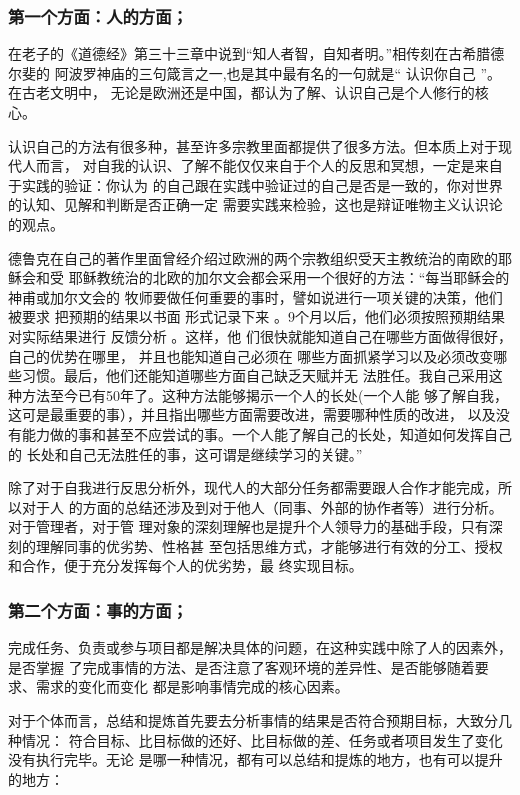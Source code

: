 \documentclass[11pt]{ctexart}
\begin{document}
{{{{\subsubsection{第一个方面：人的方面；}
\label{sec:orgd4028ee}

在老子的《道德经》第三十三章中说到“知人者智，自知者明。”相传刻在古希腊德尔斐的
阿波罗神庙的三句箴言之一,也是其中最有名的一句就是“ 认识你自己 ”。在古老文明中，
无论是欧洲还是中国，都认为了解、认识自己是个人修行的核心。

认识自己的方法有很多种，甚至许多宗教里面都提供了很多方法。但本质上对于现代人而言，
对自我的认识、了解不能仅仅来自于个人的反思和冥想，一定是来自于实践的验证：你认为
的自己跟在实践中验证过的自己是否是一致的，你对世界的认知、见解和判断是否正确一定
需要实践来检验，这也是辩证唯物主义认识论的观点。

德鲁克在自己的著作里面曾经介绍过欧洲的两个宗教组织受天主教统治的南欧的耶稣会和受
耶稣教统治的北欧的加尔文会都会采用一个很好的方法：“每当耶稣会的神甫或加尔文会的
牧师要做任何重要的事时，譬如说进行一项关键的决策，他们被要求 把预期的结果以书面
形式记录下来 。9个月以后，他们必须按照预期结果对实际结果进行 反馈分析 。这样，他
们很快就能知道自己在哪些方面做得很好，自己的优势在哪里， 并且也能知道自己必须在
哪些方面抓紧学习以及必须改变哪些习惯。最后，他们还能知道哪些方面自己缺乏天赋并无
法胜任。我自己采用这种方法至今已有50年了。这种方法能够揭示一个人的长处(一个人能
够了解自我， 这可是最重要的事），并且指出哪些方面需要改进，需要哪种性质的改进，
以及没有能力做的事和甚至不应尝试的事。一个人能了解自己的长处，知道如何发挥自己的
长处和自己无法胜任的事，这可谓是继续学习的关键。”

除了对于自我进行反思分析外，现代人的大部分任务都需要跟人合作才能完成，所以对于人
的方面的总结还涉及到对于他人（同事、外部的协作者等）进行分析。对于管理者，对于管
理对象的深刻理解也是提升个人领导力的基础手段，只有深刻的理解同事的优劣势、性格甚
至包括思维方式，才能够进行有效的分工、授权和合作，便于充分发挥每个人的优劣势，最
终实现目标。

\subsubsection{第二个方面：事的方面；}
\label{sec:orgcdd598c}

完成任务、负责或参与项目都是解决具体的问题，在这种实践中除了人的因素外，是否掌握
了完成事情的方法、是否注意了客观环境的差异性、是否能够随着要求、需求的变化而变化
都是影响事情完成的核心因素。

对于个体而言，总结和提炼首先要去分析事情的结果是否符合预期目标，大致分几种情况：
符合目标、比目标做的还好、比目标做的差、任务或者项目发生了变化没有执行完毕。无论
是哪一种情况，都有可以总结和提炼的地方，也有可以提升的地方：

}}}}
\end{document}
